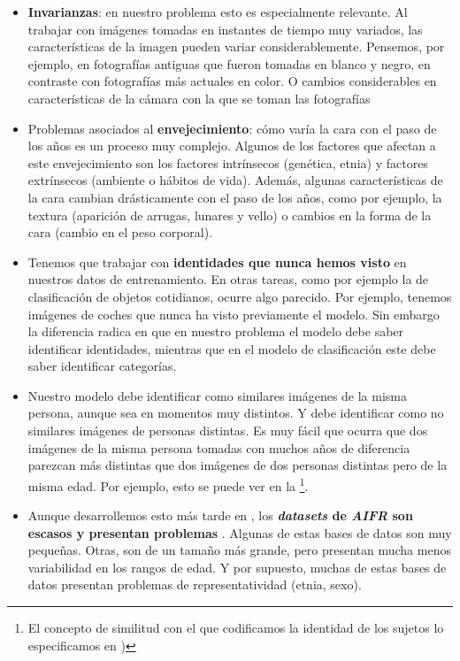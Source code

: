 \begin{itemize}
	\item \textbf{Invarianzas}: en nuestro problema esto es especialmente relevante. Al trabajar con imágenes tomadas en instantes de tiempo muy variados, las características de la imagen pueden variar considerablemente. Pensemos, por ejemplo, en fotografías antiguas que fueron tomadas en blanco y negro, en contraste con fotografías más actuales en color. O cambios considerables en características de la cámara con la que se toman las fotografías
	\item Problemas asociados al \textbf{envejecimiento}: cómo varía la cara con el paso de los años es un proceso muy complejo. Algunos de los factores que afectan a este envejecimiento \cite{informatica:tecnica_sintesis_aifr} son los factores intrínsecos (genética, etnia) y factores extrínsecos (ambiente o hábitos de vida). Además, algunas características de la cara cambian drásticamente con el paso de los años, como por ejemplo, la textura (aparición de arrugas, lunares y vello) o cambios en la forma de la cara (cambio en el peso corporal).

	\item Tenemos que trabajar con \textbf{identidades que nunca hemos visto} en nuestros datos de entrenamiento. En otras tareas, como por ejemplo la de clasificación de objetos cotidianos, ocurre algo parecido. Por ejemplo, tenemos imágenes de coches que nunca ha visto previamente el modelo. Sin embargo la diferencia radica en que en nuestro problema el modelo debe saber identificar identidades, mientras que en el modelo de clasificación este debe saber identificar categorías.

	\item Nuestro modelo debe identificar como similares imágenes de la misma persona, aunque sea en momentos muy distintos. Y debe identificar como no similares imágenes de personas distintas. Es muy fácil que ocurra que dos imágenes de la misma persona tomadas con muchos años de diferencia parezcan más distintas que dos imágenes de dos personas distintas pero de la misma edad. Por ejemplo, esto se puede ver en la  \footnote{El concepto de similitud con el que codificamos la identidad de los sujetos lo especificamos en )}.
	\item Aunque desarrollemos esto más tarde en , los \textbf{\textit{datasets} de \textit{AIFR} son escasos y presentan problemas} \cite{informatica:tecnica_sintesis_aifr}. Algunas de estas bases de datos son muy pequeñas. Otras, son de un tamaño más grande, pero presentan mucha menos variabilidad en los rangos de edad. Y por supuesto, muchas de estas bases de datos presentan problemas de representatividad (etnia, sexo).
\end{itemize}

